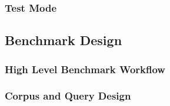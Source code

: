 {\subsubsection{Test Mode}

\subsection{Benchmark Design}
\subsubsection{High Level Benchmark Workflow}

\subsubsection{Corpus and Query Design}


}
